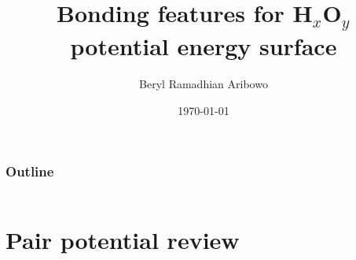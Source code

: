 \documentclass{beamer}
\title{Bonding features for H$_x$O$_y$ potential energy surface}
\author[Aribowo, Neumaier] %
{Beryl Ramadhian Aribowo}
\institute[VFM] %
{
    Joint work with Prof. Arnold Neumaier\\
    Faculty of Mathematics\\
    University of Vienna
}
\date{\today}
\begin{document}
\frame{\titlepage}

\begin{frame}
    \frametitle{Outline}
    \begin{columns}[t]
        \begin{column}{.5\textwidth}
            \tableofcontents[sections={1-2}]
        \end{column}
        \begin{column}{.5\textwidth}
            \tableofcontents[sections={3-5}]
        \end{column}
    \end{columns}
\end{frame}


\section{Pair potential review}
\end{document}
